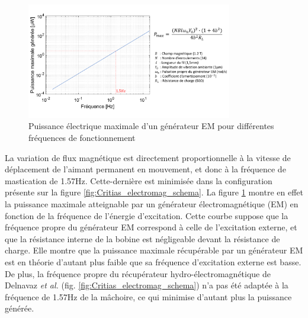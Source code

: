 \begin{figure}[!htbp]
\begin{center}
    \captionsetup{justification=centering}
	\includegraphics[trim={0cm 1cm 0cm 1cm},clip, width=0.8\textwidth]{../Chap2/Figure/puissance-frequence_electromag.pdf}
	\caption{Puissance électrique maximale d'un générateur EM pour différentes fréquences de fonctionnement \cite{Kulah2008}}
	\label{fig:puissance-frequence_electromag}
\end{center}
\end{figure}

La variation de flux magnétique est directement proportionnelle à la vitesse de déplacement de l'aimant permanent en mouvement, et donc à la fréquence de mastication de 1.57Hz. Cette-dernière est minimisée dans la configuration présente sur la figure \ref{fig:Critias_electromag_schema}. La figure \ref{fig:puissance-frequence_electromag} montre en effet la puissance maximale atteignable par un générateur électromagnétique (EM) en fonction de la fréquence de l'énergie d'excitation. Cette courbe suppose que la fréquence propre du générateur EM correspond à celle de l'excitation externe, et que la résistance interne de la bobine est négligeable devant la résistance de charge. Elle montre que la puissance maximale récupérable par un générateur EM est en théorie d'autant plus faible que sa fréquence d'excitation externe est basse. De plus, la fréquence propre du récupérateur hydro-électromagnétique de Delnavaz \emph{et al.} (fig. \ref{fig:Critias_electromag_schema}) n'a pas été adaptée à la fréquence de 1.57Hz de la mâchoire, ce qui minimise d'autant plus la puissance générée.

